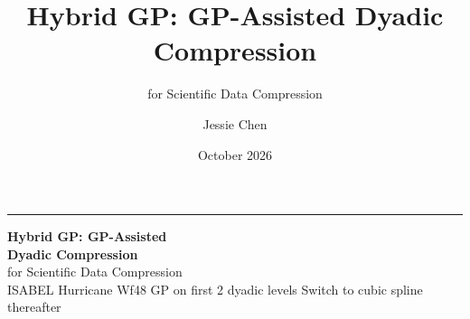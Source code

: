 \documentclass[aspectratio=169, 10pt]{beamer}
\title{Hybrid GP: GP-Assisted Dyadic Compression}
\subtitle{for Scientific Data Compression}
\author{Jessie Chen}
\institute{Argonne National Laboratory}
\date{October 2026}
\begin{document}
{
\begin{frame}[plain]
  \vspace{2em}
  {\color{cmint}\rule{3pt}{0.62\textheight}}\hspace{1em}%
  \begin{minipage}{0.88\textwidth}
    \raggedright
    {\fontsize{24}{30}\selectfont\bfseries\color{white}
      Hybrid GP: GP-Assisted\\[4pt]Dyadic Compression}\\[8pt]
    {\large\color{cice} for Scientific Data Compression}\\[24pt]
    {\small\color{cmid}
      ISABEL Hurricane Wf48 \quad
      GP on first 2 dyadic levels \quad
      Switch to cubic spline thereafter}
  \end{minipage}
\end{frame}
}
\end{document}
